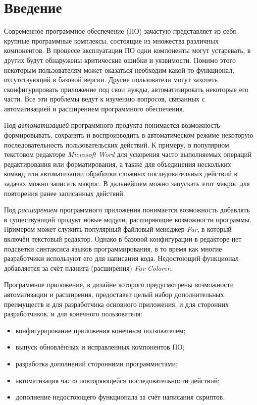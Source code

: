 \setcounter{secnumdepth}{0} %
\section{Введение}
\setcounter{secnumdepth}{2}

Современное программное обеспечение (ПО) зачастую представляет из себя крупные программные комплексы, состоящие из множества различных компонентов. В процессе эксплуатации ПО одни компоненты могут устаревать, в других будут обнаружены критические ошибки и уязвимости. Помимо этого некоторым пользователям может оказаться необходим какой-то функционал, отсутствующий в базовой версии. Другие пользователи могут захотеть сконфигурировать приложение под свои нужды, автоматизировать некоторые его части. Все эти проблемы ведут к изучению вопросов, связанных с автоматизацией и расширением программного обеспечения.

Под {\it автоматизацией} программного продукта понимается возможность формировывать, сохранять и воспроизводить в автоматическом режиме некоторую последовательность пользовательских действий. К примеру, в популярном текстовом редакторе {\it Microsoft Word} для ускорения часто выполняемых операций редактирования или форматирования, а также для объединения нескольких команд или автоматизации обработки сложных последовательных действий в задачах можно записать макрос. В дальнейшем можно запускать этот макрос для повторения ранее записанных действий.

Под {\it расширением} программного приложения понимается возможность добавлять в существующий продукт новые модули, расширяющие возможности программы. Примером может служить популярный файловый менеджер {\it Far}, в который включён текстовый редактор. Однако в базовой конфигурации в редакторе нет подсветки синтаксиса языков программирования, в то время как многие разработчики используют его для написания кода. Недостоющий функционал добавляется за счёт планига (расширения) {\it Far Colorer}. 

Программное приложение, в дизайне которого предусмотрены возможности автоматизации и расширения, предоставет целый набор дополнительных преимуществ и для разработчика основного приложения, и для сторонних разработчиков, и для конечного пользователя:
\begin{itemize}
\item конфигурирование приложения конечным ползователем;
\item выпуск обновлённых и исправленных компонентов ПО;
\item разработка дополнений сторонними программистами;
\item автоматизация часто повторяющейся последовательности действий;
\item дополнение недостоющего функционала за счёт написания скриптов.
\end{itemize}

